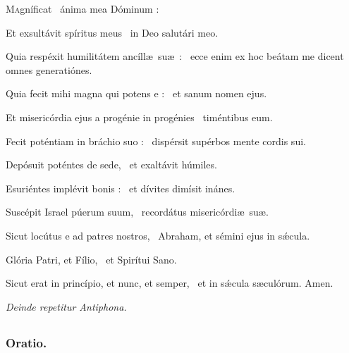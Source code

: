 \documentclass[12pt]{article} %
\newenvironment{psalmtext}{\leftskip 0.25in}{\vspace{2 mm}}
\newenvironment{rubric}{\color{benred8} \itshape \leftskip 0in \setlength{\parindent}{0.25in}}{\vspace{2 mm}}
\let\oldgresixstar\gresixstar
\renewcommand{\gresixstar}{\textcolor{benred8}{\oldgresixstar}}
\let\oldgrealtcross\grealtcross
\renewcommand{\grealtcross}{\textcolor{benred8}{\oldgrealtcross}}
\begin{document}
\begin{psalmtext}
\lettrine[lhang=0.70]{M}{a}gn\'{i}ficat \grealtcross\ \'{a}nima mea D\'{o}minum :

\hspace*{9.5 mm}Et exsult\'{a}vit sp\'{i}ritus meus \gresixstar\ in Deo salut\'{a}ri meo.

Quia resp\'{e}xit humilit\'{a}tem anc\'{i}ll\ae\ su\ae\ : \gresixstar\ ecce enim ex hoc be\'{a}tam me dicent omnes generati\'{o}nes.

Quia fecit mihi magna qui potens e : \gresixstar\ et sanum nomen ejus.

Et miseric\'{o}rdia ejus a prog\'{e}nie in prog\'{e}nies \gresixstar\ tim\'{e}ntibus eum.

Fecit pot\'{e}ntiam in br\'{a}chio suo : \gresixstar\ disp\'{e}rsit sup\'{e}rbos mente cordis sui.

Dep\'{o}suit pot\'{e}ntes de sede, \gresixstar\ et exalt\'{a}vit h\'{u}miles.

Esuri\'{e}ntes impl\'{e}vit bonis : \gresixstar\ et d\'{i}vites dim\'{i}sit in\'{a}nes.

Susc\'{e}pit Israel p\'{u}erum suum, \gresixstar\ record\'{a}tus miseric\'{o}rdi\ae\ su\ae.

Sicut loc\'{u}tus e ad patres nostros, \gresixstar\ Abraham, et s\'{e}mini ejus in s\'{\ae}cula.

Glória Patri, et Fílio, \gresixstar\ et Spirítui Sano.

Sicut erat in princípio, et nunc, et semper, \gresixstar\ et in sǽcula sæculórum. Amen.

\end{psalmtext}

\begin{rubric}
Deinde repetitur Antiphona.

\end{rubric}

\subsection*{}

\vspace*{-2.0mm}

\subsubsection*{Oratio.}
\end{document}

